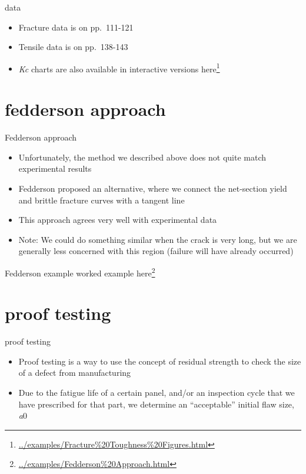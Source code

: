 \documentclass[
  letterpaper,
  ignorenonframetext,
  aspectratio=43,
  handout,
  12pt]{beamer}
\DeclareRobustCommand{\href}[2]{#2\footnote{\url{#1}}}
\providecommand{\tightlist}{%
  \setlength{\itemsep}{0pt}\setlength{\parskip}{0pt}}
\providecommand{\tightlist}{%
\setlength{\itemsep}{0pt}\setlength{\parskip}{0pt}}
\begin{document}
\begin{frame}{data}
\protect\hypertarget{data}{}
\begin{itemize}
\tightlist
\item
  Fracture data is on pp.~111-121
\item
  Tensile data is on pp.~138-143
\item
  \emph{K}\emph{c} charts are also available in interactive versions
  \href{../examples/Fracture\%20Toughness\%20Figures.html}{here}
\end{itemize}
\end{frame}

\hypertarget{fedderson-approach}{%
\section{fedderson approach}\label{fedderson-approach}}

\begin{frame}{Fedderson approach}
\protect\hypertarget{fedderson-approach-1}{}
\begin{itemize}
\tightlist
\item
  Unfortunately, the method we described above does not quite match
  experimental results
\item
  Fedderson proposed an alternative, where we connect the net-section
  yield and brittle fracture curves with a tangent line
\item
  This approach agrees very well with experimental data
\item
  Note: We could do something similar when the crack is very long, but
  we are generally less concerned with this region (failure will have
  already occurred)
\end{itemize}
\end{frame}

\begin{frame}{Fedderson example}
\protect\hypertarget{fedderson-example}{}
worked example \href{../examples/Fedderson\%20Approach.html}{here}
\end{frame}

\hypertarget{proof-testing}{%
\section{proof testing}\label{proof-testing}}

\begin{frame}{proof testing}
\protect\hypertarget{proof-testing-1}{}
\begin{itemize}
\tightlist
\item
  Proof testing is a way to use the concept of residual strength to
  check the size of a defect from manufacturing
\item
  Due to the fatigue life of a certain panel, and/or an inspection cycle
  that we have prescribed for that part, we determine an ``acceptable''
  initial flaw size, \emph{a}0
\end{itemize}
\end{frame}
\end{document}

